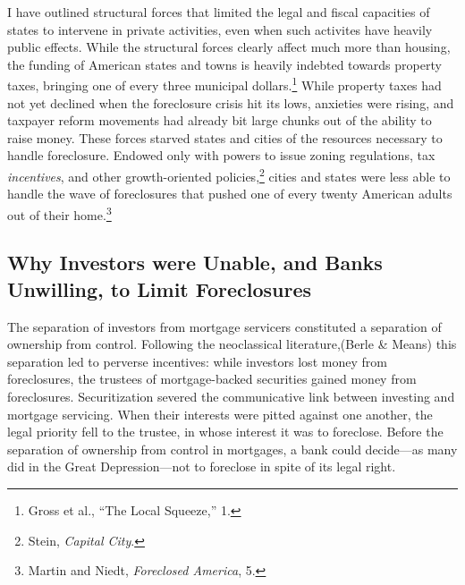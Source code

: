 \documentclass[
]{article}
\let\rmarkdownfootnote\footnote%
\def\footnote{\protect\rmarkdownfootnote}
\begin{document}
I have outlined structural forces that limited the legal and fiscal
capacities of states to intervene in private activities, even when such
activites have heavily public effects. While the structural forces
clearly affect much more than housing, the funding of American states
and towns is heavily indebted towards property taxes, bringing one of
every three municipal dollars.\footnote{Gross et al., ``The Local
  Squeeze,'' 1.} While property taxes had not yet declined when the
foreclosure crisis hit its lows, anxieties were rising, and taxpayer
reform movements had already bit large chunks out of the ability to
raise money. These forces starved states and cities of the resources
necessary to handle foreclosure. Endowed only with powers to issue
zoning regulations, tax \emph{incentives}, and other growth-oriented
policies,\footnote{Stein, \emph{Capital City}.} cities and states were
less able to handle the wave of foreclosures that pushed one of every
twenty American adults out of their home.\footnote{Martin and Niedt,
  \emph{Foreclosed America}, 5.}

\hypertarget{banks}{%
\subsection{Why Investors were Unable, and Banks Unwilling, to Limit
Foreclosures}\label{banks}}

The separation of investors from mortgage servicers constituted a
separation of ownership from control. Following the neoclassical
literature,(Berle \& Means) this separation led to perverse incentives:
while investors lost money from foreclosures, the trustees of
mortgage-backed securities gained money from foreclosures.
Securitization severed the communicative link between investing and
mortgage servicing. When their interests were pitted against one
another, the legal priority fell to the trustee, in whose interest it
was to foreclose. Before the separation of ownership from control in
mortgages, a bank could decide---as many did in the Great
Depression---not to foreclose in spite of its legal right.
\end{document}
